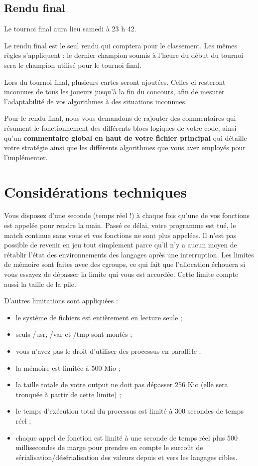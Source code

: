 \subsection{Rendu final}

Le tournoi final aura lieu samedi à 23 h 42.

Le rendu final est le seul rendu qui comptera pour le classement. Les
mêmes règles s’appliquent : le dernier champion soumis à l’heure du début
du tournoi sera le champion utilisé pour le tournoi final.

Lors du tournoi final, plusieurs cartes seront ajoutées. Celles-ci resteront
inconnues de tous les joueurs jusqu’à la fin du concours, afin de mesurer
l’adaptabilité de vos algorithmes à des situations inconnues.

Pour le rendu final, nous vous demandons de rajouter des commentaires
qui résument le fonctionnement des différents blocs logiques de votre code,
ainsi qu'un \textbf{commentaire global en haut de votre fichier principal} qui détaille
votre stratégie ainsi que les différents algorithmes que vous avez employés
pour l’implémenter.

\section{Considérations techniques}

Vous disposez d’une seconde (temps réel !) à chaque fois qu'une de vos
fonctions est appelée pour rendre la main. Passé ce délai, votre programme est
tué, le match continue sans vous et vos fonctions ne sont plus appelées. Il n’est
pas possible de revenir en jeu tout simplement parce qu'il n’y a aucun moyen
de rétablir l’état des environnements des langages après une interruption. Les
limites de mémoire sont faites avec des cgroups, ce qui fait que l’allocation
échouera si vous essayez de dépasser la limite qui vous est accordée. Cette
limite compte aussi la taille de la pile.

D’autres limitations sont appliquées :
\begin{itemize}
    \item le système de fichiers est entièrement en lecture seule ;
    \item seuls /usr, /var et /tmp sont montés ;
    \item vous n’avez pas le droit d’utiliser des processus en parallèle ;
    \item la mémoire est limitée à 500 Mio ;
    \item la taille totale de votre output ne doit pas dépasser 256 Kio (elle sera tronquée à partir de cette limite) ;
    \item le temps d’exécution total du processus est limité à 300 secondes de temps réel ;
    \item chaque appel de fonction est limité à une seconde de temps réel plus
500 millisecondes de marge pour prendre en compte le surcoût de sérialisation/désérialisation des valeurs depuis et vers les langages cibles.
\end{itemize}
